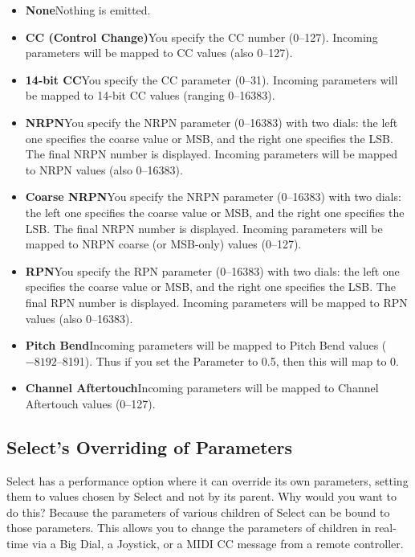 \documentclass[twoside,10pt]{article}
\begin{document}
\begin{itemize} 
\item {\bf None}\quad Nothing is emitted.
\item {\bf CC (Control Change)}\quad You specify the CC number (0--127).  Incoming parameters will be mapped to CC values (also 0--127).
\item {\bf 14-bit CC}\quad You specify the CC parameter (0--31).  Incoming parameters will be mapped to 14-bit CC values (ranging 0--16383).
\item {\bf NRPN}\quad You specify the NRPN parameter (0--16383) with two dials: the left one specifies the coarse value or MSB, and the right one specifies the LSB.  The final NRPN number is displayed.  Incoming parameters will be mapped to NRPN values (also 0--16383).
\item {\bf Coarse NRPN}\quad You specify the NRPN parameter (0--16383) with two dials: the left one specifies the coarse value or MSB, and the right one specifies the LSB.  The final NRPN number is displayed.  Incoming parameters will be mapped to NRPN coarse (or MSB-only) values (0--127).
\item {\bf RPN}\quad You specify the RPN parameter (0--16383) with two dials: the left one specifies the coarse value or MSB, and the right one specifies the LSB.  The final RPN number is displayed.  Incoming parameters will be mapped to RPN values (also 0--16383).
\item {\bf Pitch Bend}\quad Incoming parameters will be mapped to Pitch Bend values (\(-8192\)--8191).  Thus if you set the Parameter to 0.5, then this will map to 0.
\item {\bf Channel Aftertouch}\quad Incoming parameters will be mapped to Channel Aftertouch values (0--127).
\end{itemize}

\subsection{Select's Overriding of Parameters}
\label{selectparameters}

Select has a performance option where it can override its own parameters, setting them to values chosen by Select and not by its parent.  Why would you want to do this?  Because the parameters of various children of Select can be bound to those parameters.  This allows you to change the parameters of children in real-time via a Big Dial, a Joystick, or a MIDI CC message from a remote controller.
\end{document}
